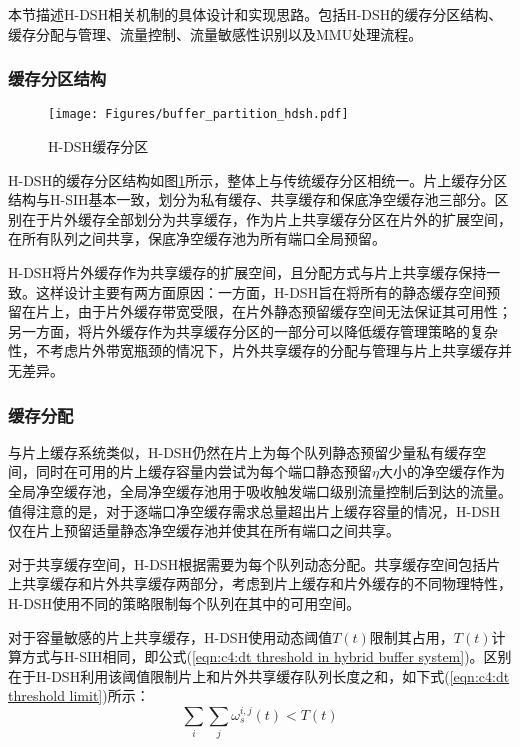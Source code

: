 
本节描述H-DSH相关机制的具体设计和实现思路。包括H-DSH的缓存分区结构、缓存分配与管理、流量控制、流量敏感性识别以及MMU处理流程。

\subsubsection{缓存分区结构}

\begin{figure}[H]
  \centering
  \texttt{[image: Figures/buffer\_partition\_hdsh.pdf]}
  \caption{H-DSH缓存分区}
  \label{c4:s1:ss1:fig:hdsh buffer partition}
\end{figure}


H-DSH的缓存分区结构如图\ref{c4:s1:ss1:fig:hdsh buffer partition}所示，整体上与传统缓存分区相统一。片上缓存分区结构与H-SIH基本一致，划分为私有缓存、共享缓存和保底净空缓存池三部分。区别在于片外缓存全部划分为共享缓存，作为片上共享缓存分区在片外的扩展空间，在所有队列之间共享，保底净空缓存池为所有端口全局预留。

H-DSH将片外缓存作为共享缓存的扩展空间，且分配方式与片上共享缓存保持一致。这样设计主要有两方面原因：一方面，H-DSH旨在将所有的静态缓存空间预留在片上，由于片外缓存带宽受限，在片外静态预留缓存空间无法保证其可用性；另一方面，将片外缓存作为共享缓存分区的一部分可以降低缓存管理策略的复杂性，不考虑片外带宽瓶颈的情况下，片外共享缓存的分配与管理与片上共享缓存并无差异。


\subsubsection{缓存分配}

与片上缓存系统类似，H-DSH仍然在片上为每个队列静态预留少量私有缓存空间，同时在可用的片上缓存容量内尝试为每个端口静态预留$\eta$大小的净空缓存作为全局净空缓存池，全局净空缓存池用于吸收触发端口级别流量控制后到达的流量。值得注意的是，对于逐端口净空缓存需求总量超出片上缓存容量的情况，H-DSH仅在片上预留适量静态净空缓存池并使其在所有端口之间共享。

对于共享缓存空间，H-DSH根据需要为每个队列动态分配。共享缓存空间包括片上共享缓存和片外共享缓存两部分，考虑到片上缓存和片外缓存的不同物理特性，H-DSH使用不同的策略限制每个队列在其中的可用空间。

对于容量敏感的片上共享缓存，H-DSH使用动态阈值$T(t)$限制其占用，$T(t)$计算方式与H-SIH相同，即公式(\ref{eqn:c4:dt threshold in hybrid buffer system})。区别在于H-DSH利用该阈值限制片上和片外共享缓存队列长度之和，如下式(\ref{eqn:c4:dt threshold limit})所示：
\begin{equation}
  \sum_{i} \sum_{j} \omega_{s}^{i,j}(t) < T(t)
  \label{eqn:c4:dt threshold limit}
\end{equation}

